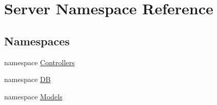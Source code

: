 \hypertarget{namespaceServer}{}\section{Server Namespace Reference}
\label{namespaceServer}
\subsection*{Namespaces}
\begin{DoxyCompactItemize}
\item 
namespace \hyperlink{namespaceServer_1_1Controllers}{Controllers}
\item 
namespace \hyperlink{namespaceServer_1_1DB}{D\+B}
\item 
namespace \hyperlink{namespaceServer_1_1Models}{Models}
\end{DoxyCompactItemize}
